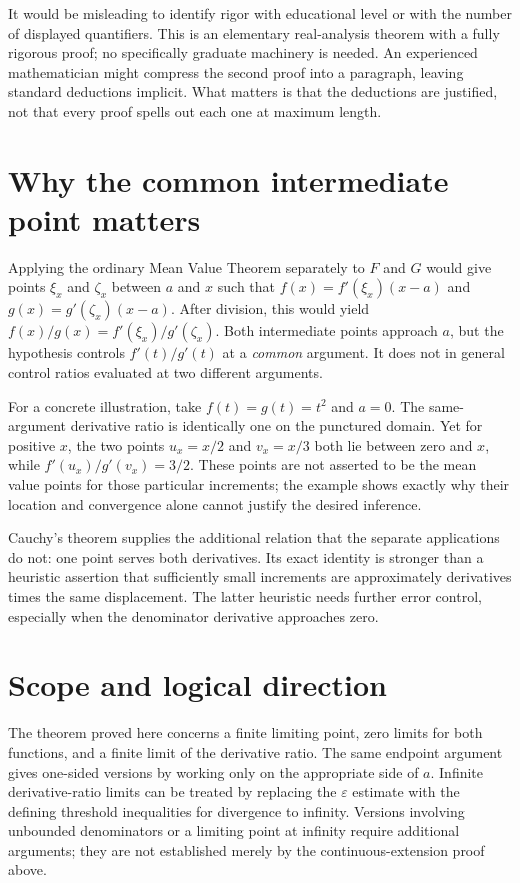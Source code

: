 \documentclass{essay}
\begin{document}
It would be misleading to identify rigor with educational level or with
the number of displayed quantifiers. This is an elementary real-analysis
theorem with a fully rigorous proof; no specifically graduate machinery
is needed. An experienced mathematician might compress the second proof
into a paragraph, leaving standard deductions implicit. What matters is
that the deductions are justified, not that every proof spells out each
one at maximum length.

\section{Why the common intermediate point matters}

Applying the ordinary Mean Value Theorem separately to \(F\) and \(G\) would
give points \(\xi_{x}\) and \(\zeta_{x}\) between \(a\) and \(x\) such that
\(f(x)=f'(\xi_{x})(x-a)\) and \(g(x)=g'(\zeta_{x})(x-a)\). After division, this
would yield \(f(x)/g(x)=f'(\xi_{x})/g'(\zeta_{x})\). Both intermediate points
approach \(a\), but the hypothesis controls \(f'(t)/g'(t)\) at a
\emph{common} argument. It does not in general control ratios evaluated
at two different arguments.

For a concrete illustration, take \(f(t)=g(t)=t^{2}\) and \(a=0\). The
same-argument derivative ratio is identically one on the punctured
domain. Yet for positive \(x\), the two points \(u_{x}=x/2\) and \(v_{x}=x/3\)
both lie between zero and \(x\), while \(f'(u_{x})/g'(v_{x})=3/2\). These points
are not asserted to be the mean value points for those particular
increments; the example shows exactly why their location and convergence
alone cannot justify the desired inference.

Cauchy's theorem supplies the additional relation that the separate
applications do not: one point serves both derivatives. Its exact
identity is stronger than a heuristic assertion that sufficiently small
increments are approximately derivatives times the same displacement.
The latter heuristic needs further error control, especially when the
denominator derivative approaches zero.

\section{Scope and logical direction}

The theorem proved here concerns a finite limiting point, zero limits
for both functions, and a finite limit of the derivative ratio. The same
endpoint argument gives one-sided versions by working only on the
appropriate side of \(a\). Infinite derivative-ratio limits can be treated
by replacing the \(\varepsilon\) estimate with the defining threshold
inequalities for divergence to infinity. Versions involving unbounded
denominators or a limiting point at infinity require additional arguments;
they are not established merely by the continuous-extension proof above.
\end{document}

